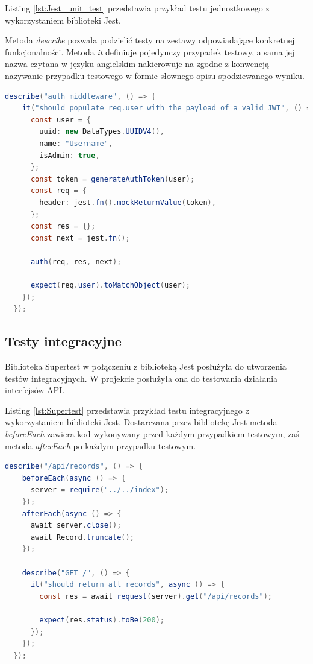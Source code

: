\documentclass{sprz}
\begin{document}
Listing \ref{lst:Jest_unit_test} przedstawia przykład testu jednostkowego z wykorzystaniem biblioteki Jest.

Metoda \textit{describe} pozwala podzielić testy na zestawy odpowiadające konkretnej funkcjonalności. Metoda \textit{it} definiuje pojedynczy przypadek testowy, a sama jej nazwa czytana w języku angielskim nakierowuje na zgodne z konwencją nazywanie przypadku testowego w formie słownego opisu spodziewanego wyniku.

\begin{lstlisting}[language=Java,caption={Test jednostkowy z wykorzystaniem Jest}, label={lst:Jest_unit_test}]
  describe("auth middleware", () => {
    it("should populate req.user with the payload of a valid JWT", () => {
      const user = {
        uuid: new DataTypes.UUIDV4(),
        name: "Username",
        isAdmin: true,
      };
      const token = generateAuthToken(user);
      const req = {
        header: jest.fn().mockReturnValue(token),
      };
      const res = {};
      const next = jest.fn();
  
      auth(req, res, next);
  
      expect(req.user).toMatchObject(user);
    });
  });
\end{lstlisting}

\subsection{Testy integracyjne}

Biblioteka Supertest w połączeniu z biblioteką Jest posłużyła do utworzenia testów integracyjnych. W projekcie posłużyła ona do testowania działania interfejsów API.

Listing \ref{lst:Supertest} przedstawia przykład testu integracyjnego z wykorzystaniem biblioteki Jest. Dostarczana przez bibliotekę Jest metoda \textit{beforeEach} zawiera kod wykonywany przed każdym przypadkiem testowym, zaś metoda \textit{afterEach} po każdym przypadku testowym.

\begin{lstlisting}[language=Java,caption={Test integracyjny z wykorzystaniem Supertest i Jest}, label={lst:Supertest}]
  describe("/api/records", () => {
    beforeEach(async () => {
      server = require("../../index");
    });
    afterEach(async () => {
      await server.close();
      await Record.truncate();
    });
  
    describe("GET /", () => {
      it("should return all records", async () => {
        const res = await request(server).get("/api/records");
  
        expect(res.status).toBe(200);
      });
    });
  });
\end{lstlisting}
\end{document}
